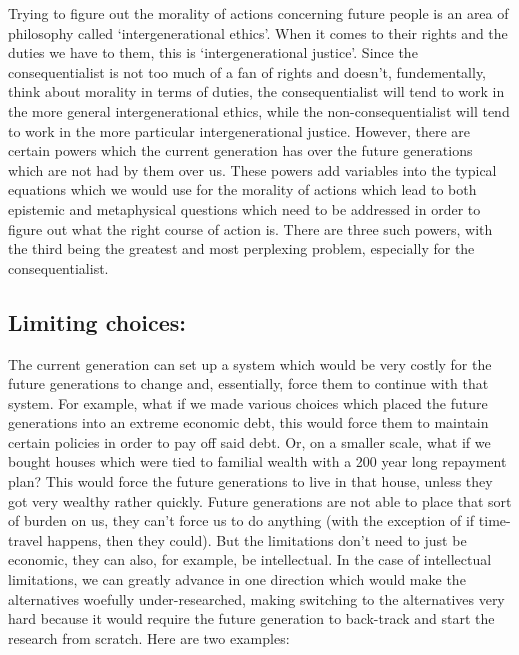 Trying to figure out the morality of actions concerning future people is an area of philosophy called ‘intergenerational ethics’. When it comes to their rights and the duties we have to them, this is `intergenerational justice'. Since the consequentialist is not too much of a fan of rights and doesn't, fundementally, think about morality in terms of duties, the consequentialist will tend to work in the more general intergenerational ethics, while the non-consequentialist will tend to work in the more particular intergenerational justice. However, there are certain powers which the current generation has over the future generations which are not had by them over us. These powers add variables into the typical equations which we would use for the morality of actions which lead to both epistemic and metaphysical questions which need to be addressed in order to figure out what the right course of action is. There are three such powers, with the third being the greatest and most perplexing problem, especially for the consequentialist.
\subsection{Limiting choices:}

The current generation can set up a system which would be very costly for the future generations to change and, essentially, force them to continue with that system. For example, what if we made various choices which placed the future generations into an extreme economic debt, this would force them to maintain certain policies in order to pay off said debt. Or, on a smaller scale, what if we bought houses which were tied to familial wealth with a 200 year long repayment plan? This would force the future generations to live in that house, unless they got very wealthy rather quickly. Future generations are not able to place that sort of burden on us, they can't force us to do anything (with the exception of if time-travel happens, then they could). But the limitations don't need to just be economic, they can also, for example, be intellectual. In the case of intellectual limitations, we can greatly advance in one direction which would make the alternatives woefully under-researched, making switching to the alternatives very hard because it would require the future generation to back-track and start the research from scratch. Here are two examples: 



